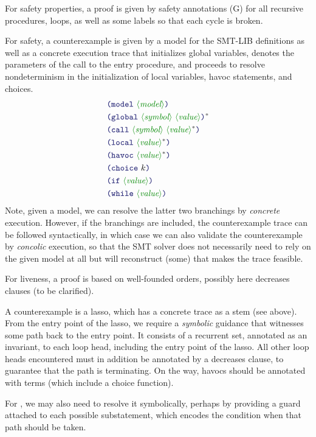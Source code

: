 \documentclass[runningheads]{llncs}
\begin{document}
For safety properties, a proof is given by safety annotations (G)
for all recursive procedures, loops, as well as some labels so that each cycle is broken.

For safety, a counterexample is given by a model for the SMT-LIB
definitions as well as a concrete execution trace
that initializes global variables, denotes the parameters
of the call to the entry procedure,
and proceeds to resolve nondeterminism in the initialization of local variables,
havoc statements, and choices.
\begin{align*}
& \LP \terminal{model}~  \nonterminal{model} \RP \\
& \LP \terminal{global}~ \nonterminal{symbol}~\nonterminal{value} \RP\rstar \\
& \LP \terminal{call}~   \nonterminal{symbol}~\nonterminal{value}\rstar \RP \\
& \LP \terminal{local}~  \nonterminal{value}\rstar \RP \\
& \LP \terminal{havoc}~  \nonterminal{value}\rstar \RP \\
& \LP \terminal{choice}~  k \RP \\
& \LP \terminal{if}~     \nonterminal{value} \RP \\
& \LP \terminal{while}~  \nonterminal{value} \RP \\
\end{align*}
Note, given a model, we can resolve the latter two branchings by \emph{concrete} execution.
However, if the branchings are included, the counterexample trace
can be followed syntactically, in which case we can also validate the counterexample
by \emph{concolic} execution, so that the SMT solver does not necessarily need to rely on the given model at all but will reconstruct (some) that makes the trace feasible.

For liveness, a proof is based on well-founded orders,
possibly here decreases clauses (to be clarified).

A counterexample is a lasso,
which has a concrete trace as a stem (see above).
From the entry point of the lasso,
we require a \emph{symbolic} guidance that witnesses some path
back to the entry point.
It consists of a recurrent set, annotated as an invariant,
to each loop head, including the entry point of the lasso.
All other loop heads encountered must in addition be annotated
by a decreases clause, to guarantee that the path is terminating.
On the way, havocs should be annotated with terms
(which include a choice function).

For , we may also need to resolve it symbolically,
perhaps by providing a guard attached to each possible substatement,
which encodes the condition when that path should be taken.
\end{document}
